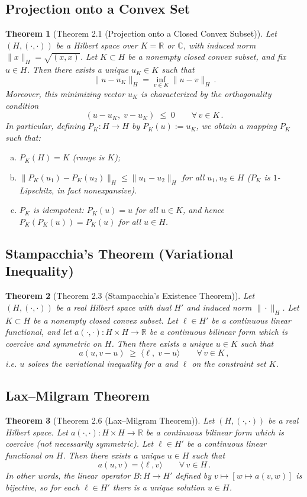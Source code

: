 \documentclass{article}
\theoremstyle{plain}
\newtheorem*{theorem*}{Theorem}
\begin{document}
\subsection*{Projection onto a Convex Set}
\begin{theorem*}[Theorem 2.1 (Projection onto a Closed Convex Subset)]
Let $(H, (\cdot,\cdot))$ be a Hilbert space over $K=\mathbb{R}$ or $\mathbb{C}$, with induced norm $\|x\|_H = \sqrt{(x,x)}$. Let $K \subset H$ be a nonempty closed convex subset, and fix $u \in H$. Then there exists a unique $u_K \in K$ such that 
\[ 
\|u - u_K\|_H = \inf_{v \in K} \|u - v\|_H\,.
\] 
Moreover, this minimizing vector $u_K$ is characterized by the orthogonality condition 
\[ 
(u - u_K,\; v - u_K) \;\le\; 0 \qquad \forall\,v \in K\,.
\] 
In particular, defining $P_K: H \to H$ by $P_K(u) := u_K$, we obtain a mapping $P_K$ such that:
\begin{enumerate}[(a)]
\item $P_K(H) = K$ (range is $K$);
\item $\|P_K(u_1) - P_K(u_2)\|_H \le \|u_1 - u_2\|_H$ for all $u_1,u_2 \in H$ ($P_K$ is $1$-Lipschitz, in fact nonexpansive).
\item $P_K$ is idempotent: $P_K(u) = u$ for all $u \in K$, and hence $P_K(P_K(u)) = P_K(u)$ for all $u \in H$.
\end{enumerate}
\end{theorem*}

\subsection*{Stampacchia’s Theorem (Variational Inequality)}
\begin{theorem*}[Theorem 2.3 (Stampacchia’s Existence Theorem)]
Let $(H,(\cdot,\cdot))$ be a real Hilbert space with dual $H'$ and induced norm $\|\cdot\|_H$. Let $K \subset H$ be a nonempty closed convex subset. Let $\ell \in H'$ be a continuous linear functional, and let $a(\cdot,\cdot): H \times H \to \mathbb{R}$ be a continuous bilinear form which is \emph{coercive} and \emph{symmetric} on $H$.  Then there exists a unique $u \in K$ such that 
\[ 
a(u, v - u) \;\ge\; \langle \ell,\;v - u\rangle \qquad \forall\,v \in K\,,
\] 
i.e. $u$ solves the variational inequality for $a$ and $\ell$ on the constraint set $K$. 
\end{theorem*}

\subsection*{Lax–Milgram Theorem}
\begin{theorem*}[Theorem 2.6 (Lax–Milgram Theorem)]
Let $(H,(\cdot,\cdot))$ be a real Hilbert space. Let $a(\cdot,\cdot): H \times H \to \mathbb{R}$ be a continuous bilinear form which is coercive (not necessarily symmetric). Let $\ell \in H'$ be a continuous linear functional on $H$. Then there exists a unique $u \in H$ such that 
\[ 
a(u, v) = \langle \ell, v \rangle \qquad \forall\,v \in H\,.
\] 
In other words, the linear operator $B: H \to H'$ defined by $v \mapsto [w \mapsto a(v,w)]$ is bijective, so for each $\ell \in H'$ there is a unique solution $u \in H$.
\end{theorem*}
\end{document}
